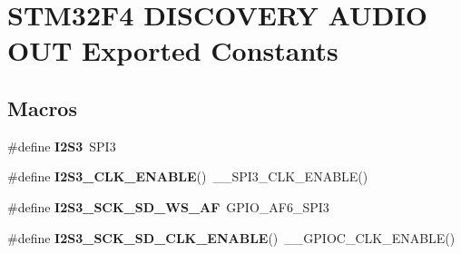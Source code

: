 \hypertarget{group___s_t_m32_f4___d_i_s_c_o_v_e_r_y___a_u_d_i_o___o_u_t___exported___constants}{}\section{S\+T\+M32\+F4 D\+I\+S\+C\+O\+V\+E\+RY A\+U\+D\+IO O\+UT Exported Constants}
\label{group___s_t_m32_f4___d_i_s_c_o_v_e_r_y___a_u_d_i_o___o_u_t___exported___constants}
\subsection*{Macros}
\begin{DoxyCompactItemize}
\item 
\mbox{\label{group___s_t_m32_f4___d_i_s_c_o_v_e_r_y___a_u_d_i_o___o_u_t___exported___constants_gabab404f66ea34fc6b25802b264cc3724}} 
\#define {\bfseries I2\+S3}~S\+P\+I3
\item 
\mbox{\label{group___s_t_m32_f4___d_i_s_c_o_v_e_r_y___a_u_d_i_o___o_u_t___exported___constants_gac2c99bcb72eef6f270a517cb51c7aa22}} 
\#define {\bfseries I2\+S3\+\_\+\+C\+L\+K\+\_\+\+E\+N\+A\+B\+LE}()~\+\_\+\+\_\+\+S\+P\+I3\+\_\+\+C\+L\+K\+\_\+\+E\+N\+A\+B\+LE()
\item 
\mbox{\label{group___s_t_m32_f4___d_i_s_c_o_v_e_r_y___a_u_d_i_o___o_u_t___exported___constants_ga7f70cc511e5c3835a79ec4a79d16ed3b}} 
\#define {\bfseries I2\+S3\+\_\+\+S\+C\+K\+\_\+\+S\+D\+\_\+\+W\+S\+\_\+\+AF}~G\+P\+I\+O\+\_\+\+A\+F6\+\_\+\+S\+P\+I3
\item 
\mbox{\label{group___s_t_m32_f4___d_i_s_c_o_v_e_r_y___a_u_d_i_o___o_u_t___exported___constants_ga8428daccf5fb517a2fb57a8360dca8e4}} 
\#define {\bfseries I2\+S3\+\_\+\+S\+C\+K\+\_\+\+S\+D\+\_\+\+C\+L\+K\+\_\+\+E\+N\+A\+B\+LE}()~\+\_\+\+\_\+\+G\+P\+I\+O\+C\+\_\+\+C\+L\+K\+\_\+\+E\+N\+A\+B\+LE()
\item 
\mbox{\label{group___s_t_m32_f4___d_i_s_c_o_v_e_r_y___a_u_d_i_o___o_u_t___exported___constants_ga7fec11ba74ec583d295ecf252a1b16d9}} 

\end{DoxyCompactItemize}

